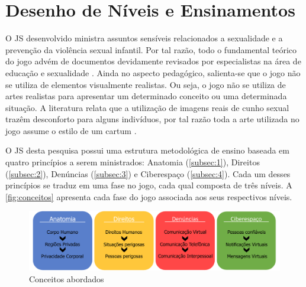 
\section{Desenho de Níveis e Ensinamentos}\label{sec:DN}

O \acf{JS} desenvolvido ministra assuntos sensíveis relacionados a sexualidade e a prevenção da violência sexual infantil. Por tal razão, todo o fundamental teórico do jogo advém de documentos devidamente revisados por especialistas na área de educação e sexualidade \cite{unesco2018international}. Ainda no aspecto pedagógico, salienta-se que o jogo não se utiliza de elementos visualmente realistas. Ou seja, o jogo não se utiliza de artes realistas para apresentar um determinado conceito ou uma determinada situação. A literatura relata que a utilização de imagens reais de cunho sexual trazêm desconforto para alguns indivíduos, por tal razão toda a arte utilizada no jogo assume o estilo de um cartum \cite{albert2020desenvolvimento}.

O \ac{JS} desta pesquisa possui uma estrutura metodológica de ensino baseada em quatro princípios a serem ministrados: Anatomia (\autoref{subsec:1}), Direitos (\autoref{subsec:2}), Denúncias (\autoref{subsec:3}) e Ciberespaço (\autoref{subsec:4}). Cada um desses princípios se traduz em uma fase no jogo, cada qual composta de três níveis. A \autoref{fig:conceitos} apresenta cada fase do jogo associada aos seus respectivos níveis.

\begin{figure}[hbt!]
  \caption{\label{fig:conceitos}Conceitos abordados}\vspace{-0.3cm}
  \begin{center}
    \includegraphics[width=\linewidth]{./Visuais/EsquemaFases.pdf}
    \end{center}\vspace{-0.3cm}
\end{figure}

\vspace{-0.4cm}

